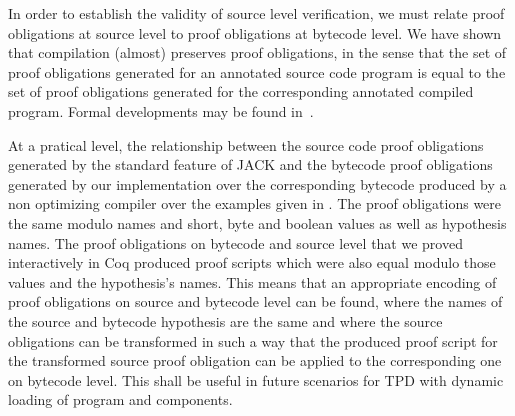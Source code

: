 In order to establish the validity of source level verification, we
must relate proof obligations at source level to proof obligations at
bytecode level. We have shown that compilation (almost) preserves
proof obligations, in the sense that the set of proof obligations
generated for an annotated source code program is equal to the set of
proof obligations generated for the corresponding annotated compiled
program. Formal developments may be found
in~\cite{gta05:fast,BP06:sac}.


At a pratical level, the relationship between the source code proof
obligations generated by the standard feature of JACK and the bytecode
proof obligations generated by our implementation over the
corresponding bytecode produced by a non optimizing compiler over the
examples given in \cite{JPVC03JKM}. The proof obligations were the
same modulo names and short, byte and boolean values as well as
hypothesis names. The proof obligations on bytecode and source level
that we proved interactively in Coq produced proof scripts which were
also equal modulo those values and the hypothesis's names. This means
that an appropriate encoding of proof obligations on source and
bytecode level can be found, where the names of the source and
bytecode hypothesis are the same and where the source obligations can
be transformed in such a way that the produced proof script for the
transformed source proof obligation can be applied to the
corresponding one on bytecode level. This shall be useful in future
scenarios for TPD with dynamic loading of program and components.





